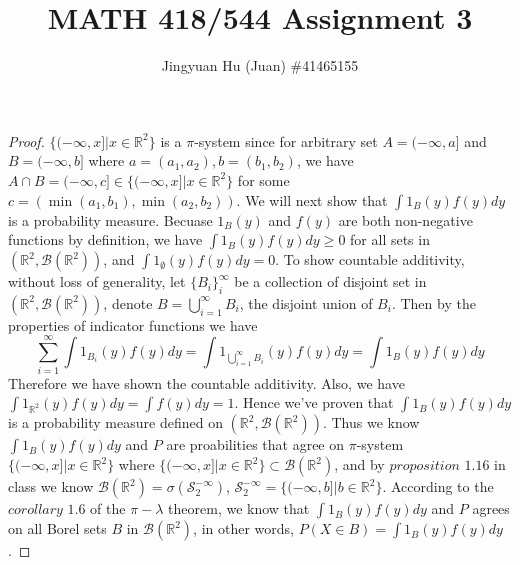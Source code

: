 \documentclass[10pt]{article}
\newenvironment{problem}[2][Problem]{\begin{trivlist}
\item[\hskip \labelsep {\bfseries #1}\hskip \labelsep {\bfseries #2.}]}{\end{trivlist}}
\begin{document}
 
\title{\vspace{-1.6cm} \large{MATH 418/544 Assignment 3}}
\author{\large{ Jingyuan Hu (Juan) \#41465155}}
\date{}
\maketitle
 
\begin{problem}{1(a)}
\end{problem}
\begin{proof}
$\{(-\infty, x]|x\in \mathbb{R}^2\}$ is a $\pi$-system since for arbitrary set $A = (-\infty, a]$ and $B = (-\infty, b]$ where $a = (a_{1}, a_{2}), b = (b_{1}, b_{2})$, we have $A \cap B = (-\infty, c] \in \{(-\infty, x]|x\in \mathbb{R}^2\}$ for some $c = (\min(a_{1}, b_{1}), \min(a_{2}, b_{2}))$. We will next show that $\int1_{B}(y)f(y)dy$ is a probability measure. Becuase $1_{B}(y)$ and $f(y)$ are both non-negative functions by definition, we have $\int1_{B}(y)f(y)dy \ge 0$ for all sets in $(\mathbb{R}^2, \mathcal{B}(\mathbb{R}^2))$, and $\int1_{\emptyset}(y)f(y)dy = 0$.  To show countable additivity, without loss of generality, let $\{B_{i}\}_{i}^{\infty}$ be a collection of disjoint set in $(\mathbb{R}^2, \mathcal{B}(\mathbb{R}^2))$, denote $B = \bigcup\limits_{i=1}^{\infty} B_{i}$, the disjoint union of $B_{i}$. Then by the properties of indicator functions we have $$\sum\limits_{i=1}^{\infty} \int1_{B_{i}}(y)f(y)dy = \int1_{\bigcup\limits_{i=1}^{\infty} B_{i}}(y)f(y)dy = \int1_{B}(y)f(y)dy$$ Therefore we have shown the countable additivity. Also, we have $\int1_{\mathbb{R}^2}(y)f(y)dy = \int f(y)dy = 1$. Hence we've proven that $\int1_{B}(y)f(y)dy$ is a probability measure defined on $(\mathbb{R}^2, \mathcal{B}(\mathbb{R}^2))$. Thus we know $\int1_{B}(y)f(y)dy$ and $P$ are proabilities that agree on $\pi$-system $\{(-\infty, x]|x\in \mathbb{R}^2\}$ where $\{(-\infty, x]|x\in \mathbb{R}^2\} \subset \mathcal{B}(\mathbb{R}^2)$, and by $\textit{proposition 1.16}$ in class we know $\mathcal{B}(\mathbb{R}^2) = \sigma(\mathcal{S}_{2}^{-\infty})$, $\mathcal{S}_{2}^{-\infty} = \{(-\infty, b]| b \in \mathbb{R}^2\}$. 
According to the $\textit{corollary 1.6}$ of the $\pi - \lambda$ theorem, we know that  $\int1_{B}(y)f(y)dy$ and $P$ agrees on all Borel sets $B$ in $\mathcal{B}(\mathbb{R}^2)$, in other words, $P(X\in B) = \int1_{B}(y)f(y)dy$.
\end{proof}
\end{document}
